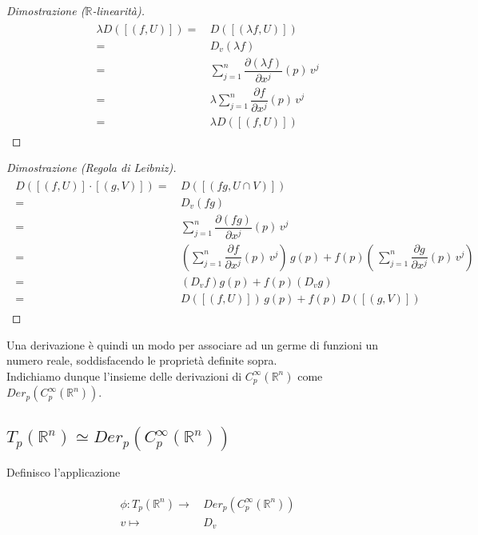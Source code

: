 \begin{proof}[Dimostrazione ($ \mathbb{R} $-linearità)]
	\begin{align}
		\begin{split}
			\lambda D ([(f,U)]) =& \, D ([(\lambda f,U)])\\
			=& \, D_{v} (\lambda f)\\
			=& \, \sum_{j=1}^{n} \dfrac{\partial (\lambda f)}{\partial x^{j}} (p) \, v^{j}\\
			=& \, \lambda \sum_{j=1}^{n} \dfrac{\partial f}{\partial x^{j}} (p) \, v^{j}\\
			=& \, \lambda D ([(f,U)])
		\end{split}
	\end{align}
\end{proof}

\begin{proof}[Dimostrazione (Regola di Leibniz)]
	\begin{align}
		\begin{split}
			D ([(f,U)] \cdot [(g,V)]) =& \, D ([(f g,U \cap V)])\\
			=& \, D_{v} (f g)\\
			=& \, \sum_{j=1}^{n} \dfrac{\partial (f g)}{\partial x^{j}} (p) \, v^{j}\\
			=& \, \left( \sum_{j=1}^{n} \dfrac{\partial f}{\partial x^{j}} (p) \, v^{j} \right) \, g(p) + f(p) \left( \, \sum_{j=1}^{n} \dfrac{\partial g}{\partial x^{j}} (p) \, v^{j} \right)\\
			=& \, (D_{v} f) g(p) + f(p) (D_{v} g)\\
			=& \, D ([(f,U)]) \, g(p) + f(p) \, D ([(g,V)])
		\end{split}
	\end{align}
\end{proof}

Una derivazione è quindi un modo per associare ad un germe di funzioni un numero reale, soddisfacendo le proprietà definite sopra.\\
Indichiamo dunque l'insieme delle derivazioni di $ C_{p}^{\infty}(\mathbb{R}^{n}) $ come $ Der_{p}(C_{p}^{\infty}(\mathbb{R}^{n})) $.

\subsection{$ T_{p}(\mathbb{R}^{n}) \simeq Der_{p}(C_{p}^{\infty}(\mathbb{R}^{n})) $}

Definisco l'applicazione

\begin{align}
	\begin{split}
		\phi : T_{p}(\mathbb{R}^{n}) \to& \, Der_{p}(C_{p}^{\infty}(\mathbb{R}^{n}))\\
		v \mapsto& \, D_{v}
	\end{split}
\end{align}

